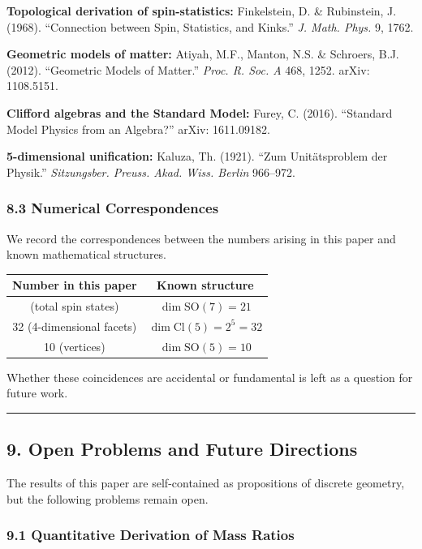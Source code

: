 \documentclass[a4paper,11pt]{article}
\newcounter{none}
\begin{document}
\textbf{Topological derivation of spin-statistics:} Finkelstein, D. \& Rubinstein, J. (1968). ``Connection between Spin, Statistics, and Kinks.'' \emph{J. Math. Phys.} 9, 1762.

\textbf{Geometric models of matter:} Atiyah, M.F., Manton, N.S. \& Schroers, B.J. (2012). ``Geometric Models of Matter.'' \emph{Proc. R. Soc. A} 468, 1252. arXiv: 1108.5151.

\textbf{Clifford algebras and the Standard Model:} Furey, C. (2016). ``Standard Model Physics from an Algebra?'' arXiv: 1611.09182.

\textbf{5-dimensional unification:} Kaluza, Th. (1921). ``Zum Unit\"atsproblem der Physik.'' \emph{Sitzungsber. Preuss. Akad. Wiss. Berlin} 966--972.

\subsubsection*{8.3 Numerical Correspondences}

We record the correspondences between the numbers arising in this paper and known mathematical structures.

{\def\LTcaptype{none}
\begin{longtable}[]{@{}cc@{}}
\toprule
Number in this paper & Known structure \\
\midrule
\endhead
\bottomrule
\endlastfoot
21 (total spin states) & $\dim \mathrm{SO}(7) = 21$ \\
32 (4-dimensional facets) & $\dim \mathrm{Cl}(5) = 2^5 = 32$ \\
10 (vertices) & $\dim \mathrm{SO}(5) = 10$ \\
\end{longtable}
}

Whether these coincidences are accidental or fundamental is left as a question for future work.

\begin{center}\rule{0.5\linewidth}{0.5pt}\end{center}

\subsection*{9. Open Problems and Future Directions}

The results of this paper are self-contained as propositions of discrete geometry, but the following problems remain open.

\subsubsection*{9.1 Quantitative Derivation of Mass Ratios}
\end{document}
